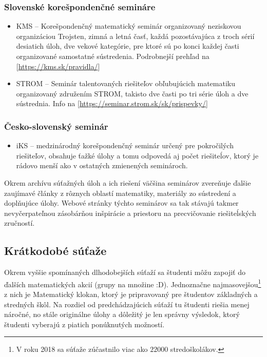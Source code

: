 \documentclass[11pt,a4paper,oneside,final]{book}
\begin{document}
\subsubsection{Slovenské korešpondenčné semináre}
\begin{itemize}
\item KMS -- Korešpondenčný matematický seminár organizovaný neziskovou organizáciou Trojsten, zimná a letná časť, každá pozostávajúca z troch sérií desiatich úloh, dve vekové kategórie, pre ktoré sú po konci každej časti organizované samostatné sústredenia. Podrobnejší prehľad na [\url{https://kms.sk/pravidla/}]
\item STROM -- Seminár talentovaných riešiteľov obľubujúcich matematiku organizovaný združením STROM, takisto dve časti po tri série úloh a dve sústrednia. Info na [\url{https://seminar.strom.sk/sk/prispevky/}]
\end{itemize}

\subsubsection*{Česko-slovenský seminár}
\begin{itemize}
\item iKS -- medzinárodný korešpondenčný seminár určený pre pokročilých riešiteľov, obsahuje ťažké úlohy a tomu odpovedá aj počet riešiteĺov, ktorý je rádovo menší ako v ostatných zmienených seminároch.
\end{itemize}

Okrem archívu súťažných úloh a ich riešení väčšina seminárov zvereňuje ďalšie zaujímavé články z rôznych oblastí matematiky, materiály zo sústredení a doplňujúce úlohy. Webové stránky týchto seminárov sa tak stávajú takmer nevyčerpateľnou zásobárňou inšpirácie a priestoru na precvičovanie riešiteĺských zručností.


\subsection*{Krátkodobé súťaže}

Okrem vyššie spomínaných dlhodobejších súťaží sa študenti môžu zapojiť do ďalších matematických akcií (grupy na množine :D). Jednoznačne najmasovejšou\footnote{V roku 2018 sa súťaže zúčastnilo viac ako $22000$ stredoškolákov.} z nich je Matematický klokan, ktorý je pripravovaný pre študentov základných a stredných škôl. Na rozdiel od predchádzajúcich súťaží tu študenti riešia menej náročné, no stále originálne úlohy a dôležitý je len správny výsledok, ktorý študenti vyberajú z piatich ponúknutých možností.
\end{document}
